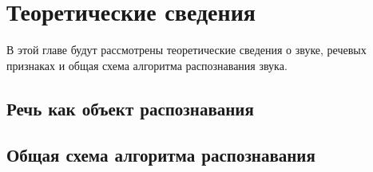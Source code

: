 \section{Теоретические сведения}

В этой главе будут рассмотрены теоретические сведения о звуке, речевых признаках и общая схема алгоритма распознавания звука.

\subsection{Речь как объект распознавания}

\subsection{Общая схема алгоритма распознавания}